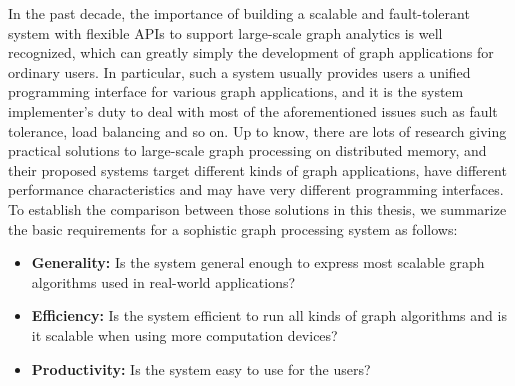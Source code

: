 \documentclass{sokendai_thesis} %
\begin{document}
In the past decade, the importance of building a scalable and fault-tolerant system with flexible APIs to support large-scale graph analytics is well recognized, which can greatly simply the development of graph applications for ordinary users.
In particular, such a system usually provides users a unified programming interface for various graph applications, and it is the system implementer's duty to deal with most of the aforementioned issues such as fault tolerance, load balancing and so on.
Up to know, there are lots of research giving practical solutions to large-scale graph processing on distributed memory, and their proposed systems target different kinds of graph applications, have different performance characteristics and may have very different programming interfaces.
To establish the comparison between those solutions in this thesis, we summarize the basic requirements for a sophistic graph processing system as follows:
\begin{itemize}
  \item \textbf{Generality:} Is the system general enough to express most scalable graph algorithms used in real-world applications?
  \item \textbf{Efficiency:} Is the system efficient to run all kinds of graph algorithms and is it scalable when using more computation devices?
  \item \textbf{Productivity:} Is the system easy to use for the users?
\end{itemize}
\end{document}
